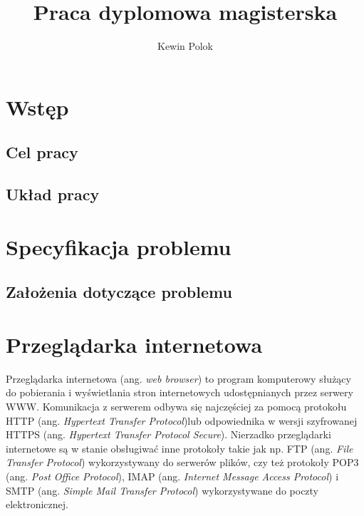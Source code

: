 \documentclass[polish, twoside, 12pt]{mwart}
\author{Kewin Polok}
\title{Praca dyplomowa magisterska}
\let\stdsection\section
\renewcommand*{\section}{\clearpage\stdsection}
\begin{document}
\maketitle
 
\newpage

\tableofcontents

\newpage

\listoffigures
 
\listoftables

\newpage

\section{Wstęp}

\subsection{Cel pracy}

\subsection{Układ pracy}

\section{Specyfikacja problemu}

\subsection{Założenia dotyczące problemu}

\section{Przeglądarka internetowa}

Przeglądarka internetowa (ang. \emph{web browser}) to program komputerowy służący do pobierania i wyświetlania stron internetowych udostępnianych przez serwery WWW. Komunikacja z serwerem odbywa się najczęściej za pomocą protokołu HTTP (ang. \emph{Hypertext Transfer Protocol})lub odpowiednika w wersji szyfrowanej HTTPS (ang. \emph{Hypertext Transfer Protocol Secure}). Nierzadko przeglądarki internetowe są w stanie obsługiwać inne protokoły takie jak np. FTP (ang. \emph{File Transfer Protocol}) wykorzystywany do serwerów plików, czy też protokoły POP3 (ang. \emph{Post Office Protocol}), IMAP (ang. \emph{Internet Message Access Protocol}) i SMTP (ang. \emph{Simple Mail Transfer Protocol}) wykorzystywane do poczty elektronicznej. 
\end{document}
